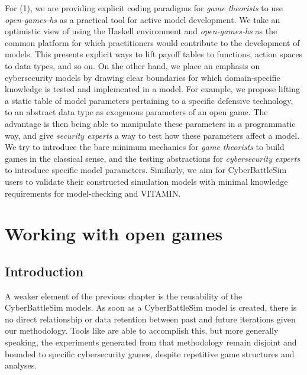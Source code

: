 \documentclass[11pt,titlepage,dvipsnames,table,xcdraw,english]{article}
\begin{document}
For (1), we are providing explicit coding paradigms for \textit{game theorists} to use \textit{open-games-hs} as a practical tool for active model development. We take an optimistic view of using the Haskell environment and \textit{open-games-hs} as the common platform for which practitioners would contribute to the development of models. This presents explicit ways to lift payoff tables to functions, action spaces to data types, and so on. On the other hand, we place an emphasis on cybersecurity models by drawing clear boundaries for which domain-specific knowledge is tested and implemented in a model. For example, we propose lifting a static table of model parameters pertaining to a specific defensive technology, to an abstract data type as exogenous parameters of an open game. The advantage is then being able to manipulate these parameters in a programmatic way, and give \textit{security experts} a way to test how these parameters affect a model. We try to introduce the bare minimum mechanics for \textit{game theorists} to build games in the classical sense, and the testing abstractions for \textit{cybersecurity experts} to introduce specific model parameters. Similarly, we aim for CyberBattleSim users to validate their constructed simulation models with minimal knowledge requirements for model-checking and VITAMIN.  






\section{Working with open games}
\label{sec:opengames}
\subsection{Introduction}
A weaker element of the previous chapter is the reusability of the CyberBattleSim models. As soon as a CyberBattleSim model is created, there is no direct relationship or data retention between past and future iterations given our methodology. Tools like \cite{EGTAOnline} are able to accomplish this, but more generally speaking, the experiments generated from that methodology remain disjoint and bounded to specific cybersecurity games, despite repetitive game structures and analyses. 
\end{document}
